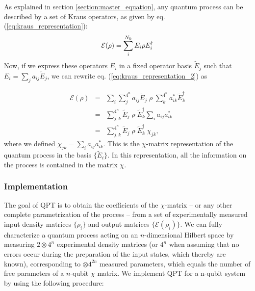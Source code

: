 As explained in section \ref{section:master_equation}, any quantum process can be described by a set of Kraus operators, as given by eq. (\ref{eq:kraus_representation}):
%
\begin{equation}
\begin{mathcal}E\end{mathcal}(\rho) = \sum\limits_i^{N_k} E_i \rho E_i^\dagger \label{eq:kraus_representation_2}
\end{equation}
%
Now, if we express these operators $E_i$ in a fixed operator basis $\tilde{E}_j$ such that $E_i = \sum_j a_{ij} \tilde{E}_{j}$, we can rewrite eq. (\ref{eq:kraus_representation_2}) as

\begin{eqnarray}
 \mathcal{E}(\rho) & = & \sum\limits_i \sum\limits_j^{4^n} a_{ij} \tilde{E}_j \;\rho\; \sum\limits_k^{4^n} a_{ik}^* \tilde{E}_k^\dagger \\
& = & \sum\limits_{j,k}^{4^n}\tilde{E}_j \; \rho \; \tilde{E}_k^\dagger \sum\limits_i a_{ij} a_{ik}^* \\
& = & \sum\limits_{j,k}^{4^n}\tilde{E}_j \; \rho \; \tilde{E}_k^\dagger \; \chi_{jk}, \label{eq:process_chi_representation}
\end{eqnarray}
where we defined $\chi_{jk} = \sum\limits_i a_{ij} a_{ik}^*$. This is the $\chi$-matrix representation of the quantum process in the basis $\{\tilde{E}_i\}$. In this representation, all the information on the process is contained in the matrix $\chi$.

\subsubsection{Implementation}

The goal of QPT is to obtain the coefficients of the $\chi$-matrix -- or any other complete parametrization of the process -- from a set of experimentally measured input density matrices $\{\rho_i\}$ and output matrices $\{\mathcal{E}(\rho_i)\}$. We can fully characterize a quantum process acting on an $n$-dimensional Hilbert space by measuring $2\otimes 4^n$ experimental density matrices (or $4^n$ when assuming that no errors occur during the preparation of the input states, which thereby are known), corresponding to $\otimes 4^{2n}$ measured parameters, which equals the number of free parameters of a $n$-qubit $\chi$ matrix. We implement QPT for a n-qubit system by using the following procedure:

